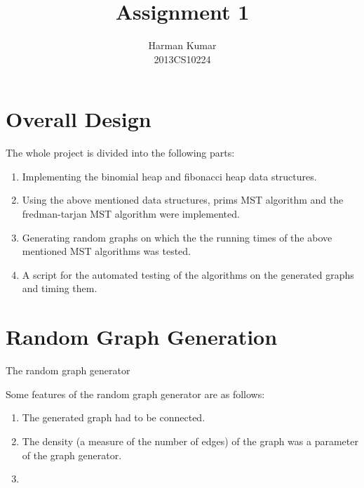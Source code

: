 \documentclass[]{article}
\begin{document}
\author{
		Harman Kumar\\
		2013CS10224		
		}

\title{Assignment 1}
\maketitle







\section{Overall Design}

\begin{flushleft}
The whole project is divided into the following parts:

\begin{enumerate}

\item Implementing the binomial heap and fibonacci heap data structures.

\item Using the above mentioned data structures, prims MST algorithm and the fredman-tarjan MST algorithm were implemented.

\item Generating random graphs on which the the running times of the above mentioned MST algorithms was tested. 

\item A script for the automated testing of the algorithms on the generated graphs and timing them.  

\end{enumerate} 

\end{flushleft} 



\section{Random Graph Generation}
\begin{flushleft}
	The random graph generator 
	
	Some features of the random graph generator are as follows:
	
\begin{enumerate}
	\item The generated graph had to be connected.

	\item The density (a measure of the number of edges) of the graph was a parameter of the graph generator.
	
	\item 
\end{enumerate}
	
\end{flushleft}
\end{document}
